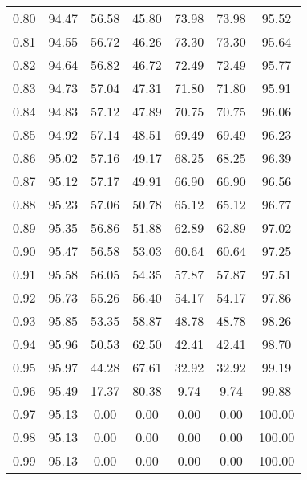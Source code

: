 \begin{tabular}{|c|c|c|c|c|c|c|}
      0.80 &     94.47 &     56.58 &      45.80 &   73.98 &      73.98 &         95.52 \\
      0.81 &     94.55 &     56.72 &      46.26 &   73.30 &      73.30 &         95.64 \\
      0.82 &     94.64 &     56.82 &      46.72 &   72.49 &      72.49 &         95.77 \\
      0.83 &     94.73 &     57.04 &      47.31 &   71.80 &      71.80 &         95.91 \\
      0.84 &     94.83 &     57.12 &      47.89 &   70.75 &      70.75 &         96.06 \\
      0.85 &     94.92 &     57.14 &      48.51 &   69.49 &      69.49 &         96.23 \\
      0.86 &     95.02 &     57.16 &      49.17 &   68.25 &      68.25 &         96.39 \\
      0.87 &     95.12 &     57.17 &      49.91 &   66.90 &      66.90 &         96.56 \\
      0.88 &     95.23 &     57.06 &      50.78 &   65.12 &      65.12 &         96.77 \\
      0.89 &     95.35 &     56.86 &      51.88 &   62.89 &      62.89 &         97.02 \\
      0.90 &     95.47 &     56.58 &      53.03 &   60.64 &      60.64 &         97.25 \\
      0.91 &     95.58 &     56.05 &      54.35 &   57.87 &      57.87 &         97.51 \\
      0.92 &     95.73 &     55.26 &      56.40 &   54.17 &      54.17 &         97.86 \\
      0.93 &     95.85 &     53.35 &      58.87 &   48.78 &      48.78 &         98.26 \\
      0.94 &     95.96 &     50.53 &      62.50 &   42.41 &      42.41 &         98.70 \\
      0.95 &     95.97 &     44.28 &      67.61 &   32.92 &      32.92 &         99.19 \\
      0.96 &     95.49 &     17.37 &      80.38 &    9.74 &       9.74 &         99.88 \\
      0.97 &     95.13 &      0.00 &       0.00 &    0.00 &       0.00 &        100.00 \\
      0.98 &     95.13 &      0.00 &       0.00 &    0.00 &       0.00 &        100.00 \\
      0.99 &     95.13 &      0.00 &       0.00 &    0.00 &       0.00 &        100.00 \\
\bottomrule
\end{tabular}
